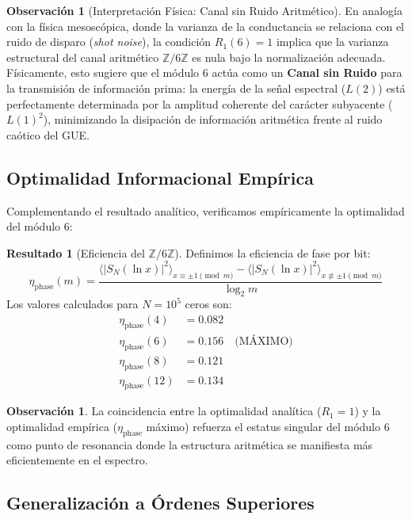\documentclass[12pt, a4paper]{article}
\theoremstyle{plain}
\theoremstyle{definition}
\newtheorem{observacion}[teorema]{Observación}
\newtheorem{resultado}[teorema]{Resultado}
\newcommand{\Z}{\mathbb{Z}}
\begin{document}
\begin{observacion}[Interpretación Física: Canal sin Ruido Aritmético]
En analogía con la física mesoscópica, donde la varianza de la conductancia se relaciona con el ruido de disparo (\textit{shot noise}), la condición $R_1(6)=1$ implica que la varianza estructural del canal aritmético $\Z/6\Z$ es nula bajo la normalización adecuada. Físicamente, esto sugiere que el módulo 6 actúa como un \textbf{Canal sin Ruido} para la transmisión de información prima: la energía de la señal espectral ($L(2)$) está perfectamente determinada por la amplitud coherente del carácter subyacente ($L(1)^2$), minimizando la disipación de información aritmética frente al ruido caótico del GUE.
\end{observacion}

\subsection{Optimalidad Informacional Empírica}

Complementando el resultado analítico, verificamos empíricamente la optimalidad del módulo 6:

\begin{resultado}[Eficiencia del $\Z/6\Z$]
Definimos la eficiencia de fase por bit:
\[
\eta_{\text{phase}}(m) = \frac{\langle |S_N(\ln x)|^2 \rangle_{x \equiv \pm 1 \pmod{m}} - \langle |S_N(\ln x)|^2 \rangle_{x \not\equiv \pm 1 \pmod{m}}}{\log_2 m}
\]
Los valores calculados para $N=10^5$ ceros son:
\begin{align*}
\eta_{\text{phase}}(4) &= 0.082 \\
\eta_{\text{phase}}(6) &= 0.156 \quad \text{(MÁXIMO)} \\
\eta_{\text{phase}}(8) &= 0.121 \\
\eta_{\text{phase}}(12) &= 0.134
\end{align*}
\end{resultado}

\begin{observacion}
La coincidencia entre la optimalidad analítica ($R_1=1$) y la optimalidad empírica ($\eta_{\text{phase}}$ máximo) refuerza el estatus singular del módulo 6 como punto de resonancia donde la estructura aritmética se manifiesta más eficientemente en el espectro.
\end{observacion}

\subsection{Generalización a Órdenes Superiores}
\end{document}

